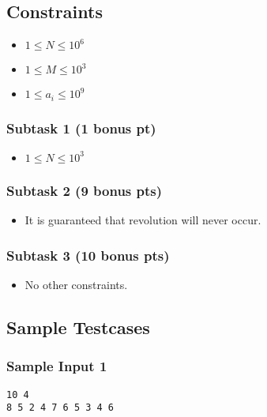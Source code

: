 \subsection{Constraints} \label{constraint}
\begin{itemize}
\tightlist
    \item $1 \le N \le 10^6$
    \item $1 \le M \le 10^3$
    \item $1 \le a_i \le 10^9$
\end{itemize}

\subsubsection{Subtask 1 (1 bonus pt)}\label{subtask-1}

\begin{itemize}
\tightlist
\item $1 \le N \le 10^3$
\end{itemize}

\subsubsection{Subtask 2 (9 bonus pts)}\label{subtask-2}

\begin{itemize}
\tightlist
\item It is guaranteed that revolution will never occur. 
\end{itemize}

\subsubsection{Subtask 3 (10 bonus pts)}\label{subtask-3}

\begin{itemize}
\tightlist
\item No other constraints.
\end{itemize}

\newpage

\subsection{Sample Testcases}

\subsubsection{Sample Input 1}\label{sample-input-1}
\begin{verbatim}
10 4
8 5 2 4 7 6 5 3 4 6
\end{verbatim}

